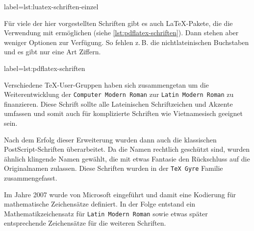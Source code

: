\begin{lfgwcode}{label={lst:luatex-schriften-einzel}}
  \newfontface{}
  \usepackage{fontawesome}  
\end{lfgwcode}

Für viele der hier vorgestellten Schriften gibt es auch \LaTeX-Pakete, 
die die Verwendung mit \pdfLaTeX{} ermöglichen (siehe \ref{lst:pdflatex-schriften}). 
Dann stehen aber weniger Optionen zur Verfügung.
So fehlen z.\,B. die nichtlateinischen Buchstaben und es gibt nur eine Art Ziffern.

\begin{lfgwcode}{label={lst:pdflatex-schriften}}
  \usepackage{libertine}
\end{lfgwcode}



Verschiedene \TeX-User-Gruppen haben sich zusammengetan um die Weiterentwicklung der 
\texttt{Computer Modern Roman} zur \texttt{Latin Modern Roman} zu finanzieren.
Diese Schrift sollte alle Lateinischen Schriftzeichen und Akzente umfassen und 
somit auch für komplizierte Schriften wie Vietnamesisch geeignet sein.

Nach dem Erfolg dieser Erweiterung wurden dann auch die klassischen PostScript-Schriften überarbeitet.
Da die Namen rechtlich geschützt sind, wurden ähnlich klingende Namen gewählt,
die mit etwas Fantasie den Rückschluss auf die Originalnamen zulassen.
Diese Schriften wurden in der \texttt{TeX Gyre} Familie zusammengefasst.

Im Jahre 2007 wurde von Microsoft  eingeführt und damit eine 
Kodierung für mathematische Zeichensätze definiert.
In der Folge entstand ein Mathematikzeichensatz für \texttt{Latin Modern Roman} sowie etwas später 
entsprechende Zeichensätze für die weiteren Schriften.

\newfontfamily{}
\newfontfamily{}
\newfontfamily{}
\newfontfamily{}
\newfontfamily{}
\newfontfamily{}
\newfontfamily{}
\newfontfamily{}
\newfontfamily{}

